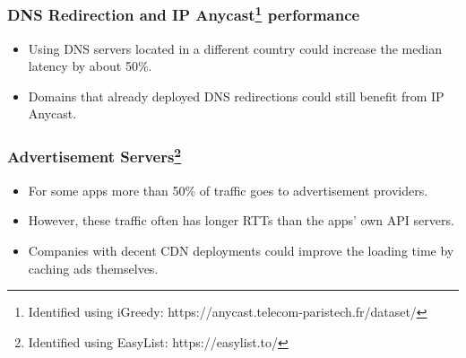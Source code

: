 
\begin{frame}
    \setcounter{footnote}{0}
    \frametitle{DNS Redirection and IP Anycast\footnote{Identified using iGreedy: https://anycast.telecom-paristech.fr/dataset/} performance}

    \begin{itemize}
        \setlength{\itemsep}{1.4em}
        \item Using DNS servers located in a different country could increase the median latency by about 50\%.
        \item Domains that already deployed DNS redirections could still benefit from IP Anycast.
    \end{itemize}
\end{frame}


\begin{frame}
    \setcounter{footnote}{0}
    \frametitle{Advertisement Servers\footnote{Identified using EasyList: https://easylist.to/}}

    \begin{itemize}
        \setlength{\itemsep}{1.4em}
        \item For some apps more than 50\% of traffic goes to advertisement providers.
        \item However, these traffic often has longer RTTs than the apps' own API servers.
        \item Companies with decent CDN deployments could improve the loading time by caching ads themselves.
    \end{itemize}


\end{frame}
